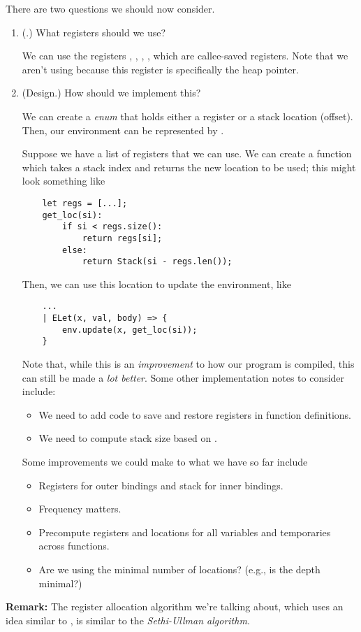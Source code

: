 \documentclass[letterpaper]{article}
\begin{document}
\bigskip 

There are two questions we should now consider.
\begin{enumerate}
    \item (.) What registers should we use?
    \begin{mdframed}
        We can use the registers , , , , which are callee-saved registers. Note that we aren't using  because this register is specifically the heap pointer.
    \end{mdframed}
    \item (Design.) How should we implement this?
    \begin{mdframed}
        We can create a  \emph{enum} that holds either a register or a stack location (offset). Then, our environment can be represented by .

        \bigskip 

        Suppose we have a list of registers that we can use. We can create a  function which takes a stack index and returns the new location to be used; this might look something like 
        \begin{verbatim}
    let regs = [...];
    get_loc(si):
        if si < regs.size():
            return regs[si];
        else:
            return Stack(si - regs.len());\end{verbatim}
        Then, we can use this location to update the environment, like 
        \begin{verbatim}
    ... 
    | ELet(x, val, body) => {
        env.update(x, get_loc(si));
    }\end{verbatim}
        Note that, while this is an \emph{improvement} to how our program is compiled, this can still be made a \emph{lot better}. Some other implementation notes to consider include: 
        \begin{itemize}
            \item We need to add code to save and restore registers in function definitions.
            \item We need to compute stack size based on .
        \end{itemize}
        Some improvements we could make to what we have so far include 
        \begin{itemize}
            \item Registers for outer bindings and stack for inner bindings. 
            \item Frequency matters. 
            \item Precompute registers and locations for all variables and temporaries across functions. 
            \item Are we using the minimal number of locations? (e.g., is the depth minimal?)
        \end{itemize}
    \end{mdframed} 
\end{enumerate}
\textbf{Remark:} The register allocation algorithm we're talking about, which uses an idea similar to , is similar to the \emph{Sethi-Ullman algorithm}.
\end{document}
